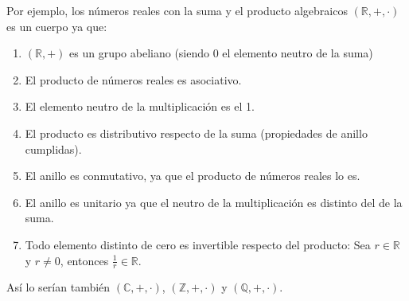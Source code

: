 Por ejemplo, los números reales con la suma y el producto algebraicos $(\mathbb{R},+,\cdot)$ es un cuerpo ya que:
\begin{enumerate}
\item $(\mathbb{R}, +)$ es un grupo abeliano (siendo 0 el elemento neutro de la suma)
\item El producto de números reales es asociativo.
\item El elemento neutro de la multiplicación es el 1.
\item El producto es distributivo respecto de la suma (propiedades de anillo cumplidas).
\item El anillo es conmutativo, ya que el producto de números reales lo es.
\item El anillo es unitario ya que el neutro de la multiplicación es distinto del de la suma.
\item Todo elemento distinto de cero es invertible respecto del producto:
Sea $r\in \mathbb{R}$ y $r \neq 0$, entonces $\frac{1}{r} \in \mathbb{R}$.
\end{enumerate}
Así lo serían también $(\mathbb{C},+,\cdot)$, $(\mathbb{Z},+,\cdot)$ y $(\mathbb{Q},+,\cdot)$.

